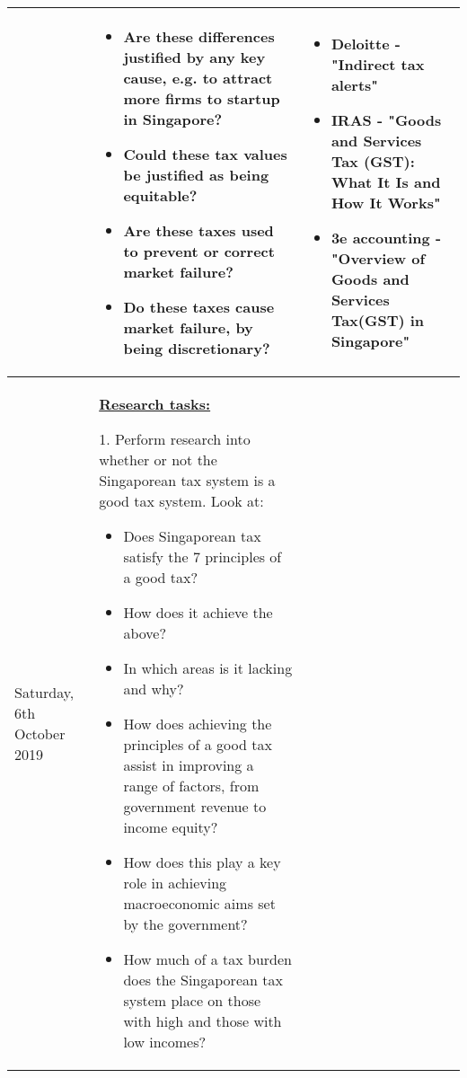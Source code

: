 \documentclass[12pt, a4paper]{article}
\newlength\combinedlength
\begin{document}
\begin{landscape}
\begin{longtable}{|m{5cm}|m{5cm}|m{5cm}|m{10.31cm}|}
		\\
		\hline
		
		& \multicolumn{2}{m{\combinedlength}|}{
			
			\begin{itemize}
				\item Are these differences justified by any key cause, e.g. to attract more firms to startup in Singapore?
				\item Could these tax values be justified as being equitable?
				\item  Are these taxes used to prevent or correct market failure?
				\item Do these taxes cause market failure, by being discretionary?
			\end{itemize}
			
			
		}&
		
		\begin{itemize}
			\item Deloitte - "Indirect tax alerts"
			\item IRAS - "Goods and Services Tax (GST): What It Is and How It Works"
			\item 3e accounting - "Overview of Goods and Services Tax(GST) in Singapore"
		\end{itemize}
		
		\\
		\hline
		
		Saturday, 6th October 2019 & \multicolumn{2}{|m{\combinedlength}|}{	
			
			\textbf{\underline{Research tasks:}}
			\newline
			
			1. Perform research into whether or not the Singaporean tax system is a good tax system. Look at:
			
			\begin{itemize}
				\item Does Singaporean tax satisfy the 7 principles of a good tax?
				\item How does it achieve the above?
				\item In which areas is it lacking and why?
				\item How does achieving the principles of a good tax assist in improving a range of factors, from government revenue to income equity?
				\item How does this play a key role in achieving macroeconomic aims set by the government?
				\item How much of a tax burden does the Singaporean tax system place on those with high and those with low incomes?
			\end{itemize}
			
}
\end{longtable}
\end{landscape}
\end{document}

